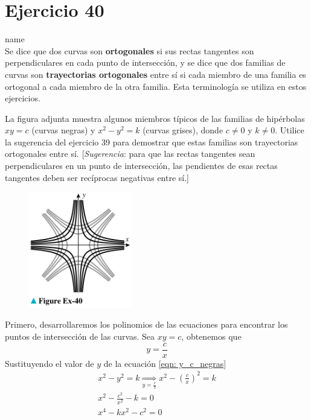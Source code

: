 \documentclass[12pt]{article}
\begin{document}
\section{Ejercicio 40} name \\

Se dice que dos curvas son \textbf{ortogonales} si sus rectas tangentes son perpendiculares en cada punto de intersección, y se dice que dos familias de curvas son \textbf{trayectorias ortogonales} entre sí si cada miembro de una familia es ortogonal a cada miembro de la otra familia. Esta terminología se utiliza en estos ejercicios.

La figura adjunta muestra algunos miembros típicos de las familias de hipérbolas $xy=c$ (curvas negras) y $x^2-y^2=k$ (curvas grises), donde $c \neq 0$ y $k \neq 0$. Utilice la sugerencia del ejercicio 39 para demostrar que estas familias son trayectorias ortogonales entre sí. [\textit{Sugerencia}: para que las rectas tangentes sean perpendiculares en un punto de intersección, las pendientes de esas rectas tangentes deben ser recíprocas negativas entre sí.]

\begin{figure}[H]
\centering
\includegraphics[width=0.4\textwidth]{../img/img_Lista2/3_40.png}
\end{figure}

Primero, desarrollaremos los polinomios de las ecuaciones para encontrar los puntos de intersección de las curvas.
Sea $xy=c$, obtenemos que
\begin{equation} \label{eqn: y_c_negras}
y=\frac{c}{x}
\end{equation}
Sustituyendo el valor de $y$ de la ecuación \eqref{eqn: y_c_negras}
  \begin{align*} 
    x^2-y^2=k \underset{y=\frac{c}{x}}{\Longrightarrow} x^2- \left( \frac{c}{x} \right) ^2=k\\
    x^2-\frac{c^2}{x^2}-k=0\\
    x^4-kx^2-c^2=0
  \end{align*}
\end{document}
